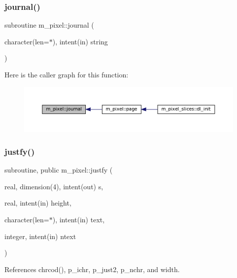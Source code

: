 \subsubsection{\texorpdfstring{journal()}{journal()}}
{\footnotesize\ttfamily subroutine m\+\_\+pixel\+::journal (\begin{DoxyParamCaption}\item[{character(len=$\ast$), intent(in)}]{string }\end{DoxyParamCaption})\hspace{0.3cm}{\ttfamily [private]}}

Here is the caller graph for this function\+:
\nopagebreak
\begin{figure}[H]
\begin{center}
\leavevmode
\includegraphics[width=350pt]{namespacem__pixel_ac39c9efa849915aff58657e2df03fe3c_icgraph}
\end{center}
\end{figure}
\mbox{\label{namespacem__pixel_a7b08886c913b47694edeb60fa747afc4}} 
\subsubsection{\texorpdfstring{justfy()}{justfy()}}
{\footnotesize\ttfamily subroutine, public m\+\_\+pixel\+::justfy (\begin{DoxyParamCaption}\item[{real, dimension(4), intent(out)}]{s,  }\item[{real, intent(in)}]{height,  }\item[{character(len=$\ast$), intent(in)}]{text,  }\item[{integer, intent(in)}]{ntext }\end{DoxyParamCaption})}



References chrcod(), p\+\_\+ichr, p\+\_\+just2, p\+\_\+nchr, and width.

